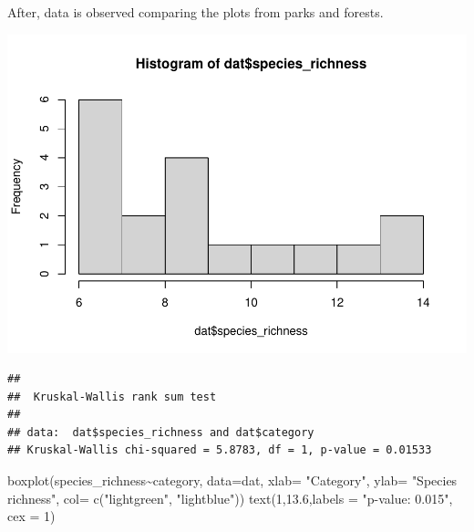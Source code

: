 \documentclass[
]{article}
\newenvironment{Shaded}{\begin{snugshade}}{\end{snugshade}}
\newcommand{\AttributeTok}[1]{\textcolor[rgb]{0.77,0.63,0.00}{#1}}
\newcommand{\CommentTok}[1]{\textcolor[rgb]{0.56,0.35,0.01}{\textit{#1}}}
\newcommand{\DecValTok}[1]{\textcolor[rgb]{0.00,0.00,0.81}{#1}}
\newcommand{\FloatTok}[1]{\textcolor[rgb]{0.00,0.00,0.81}{#1}}
\newcommand{\FunctionTok}[1]{\textcolor[rgb]{0.00,0.00,0.00}{#1}}
\newcommand{\NormalTok}[1]{#1}
\newcommand{\SpecialCharTok}[1]{\textcolor[rgb]{0.00,0.00,0.00}{#1}}
\newcommand{\StringTok}[1]{\textcolor[rgb]{0.31,0.60,0.02}{#1}}
\begin{document}
After, data is observed comparing the plots from parks and forests.

\begin{Shaded}
\end{Shaded}

\includegraphics{birdsdataanalysis_files/figure-latex/unnamed-chunk-5-1.pdf}

\begin{Shaded}
\end{Shaded}

\begin{verbatim}
## 
##  Kruskal-Wallis rank sum test
## 
## data:  dat$species_richness and dat$category
## Kruskal-Wallis chi-squared = 5.8783, df = 1, p-value = 0.01533
\end{verbatim}

\begin{Shaded}
\begin{Highlighting}[]
\FunctionTok{boxplot}\NormalTok{(species\_richness}\SpecialCharTok{\textasciitilde{}}\NormalTok{category, }\AttributeTok{data=}\NormalTok{dat, }\AttributeTok{xlab=} \StringTok{"Category"}\NormalTok{, }\AttributeTok{ylab=} \StringTok{"Species richness"}\NormalTok{, }\AttributeTok{col=} \FunctionTok{c}\NormalTok{(}\StringTok{"lightgreen"}\NormalTok{, }\StringTok{"lightblue"}\NormalTok{))}
\FunctionTok{text}\NormalTok{(}\DecValTok{1}\NormalTok{,}\FloatTok{13.6}\NormalTok{,}\AttributeTok{labels =} \StringTok{"p{-}value: 0.015"}\NormalTok{, }\AttributeTok{cex =} \DecValTok{1}\NormalTok{)}
\end{Highlighting}
\end{Shaded}
\end{document}
